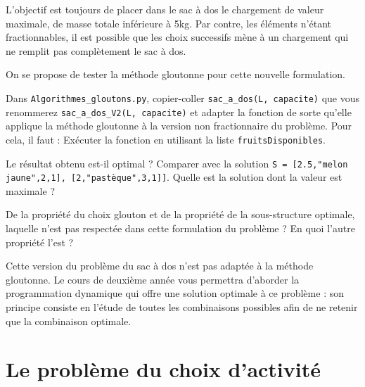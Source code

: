L’objectif est toujours de placer dans le sac à dos le chargement de valeur maximale, de masse totale inférieure à 5kg. Par contre, les éléments n’étant fractionnables, il est possible que les choix successifs mène à un chargement qui ne remplit pas complètement le sac à dos.

On se propose de tester la méthode gloutonne pour cette nouvelle formulation. 

 

\begin{question}
Dans \lstinline{Algorithmes_gloutons.py}, copier-coller \lstinline{sac_a_dos(L, capacite)} que vous renommerez \lstinline{sac_a_dos_V2(L, capacite)} et adapter la fonction de sorte qu’elle applique la méthode gloutonne à la version non fractionnaire du problème. Pour cela, il faut :
Exécuter la fonction en utilisant la liste \lstinline{fruitsDisponibles}.

\end{question}

\begin{question}
Le résultat obtenu est-il optimal ? Comparer avec la solution \lstinline{S = [2.5,"melon jaune",2,1], [2,"pastèque",3,1]]}. Quelle est la solution dont la valeur est maximale ?
\end{question}

\begin{question}
De la propriété du choix glouton et de la propriété de la sous-structure optimale, laquelle n’est pas respectée dans cette formulation du problème ? En quoi l’autre propriété l’est ?
\end{question}

 
Cette version du problème du sac à dos n’est pas adaptée à la méthode gloutonne. Le cours de deuxième année vous permettra d’aborder la programmation dynamique qui offre une solution optimale à ce problème : son principe consiste en l’étude de toutes les combinaisons possibles afin de ne retenir que la combinaison optimale.


\section*{Le problème du choix d'activité}

